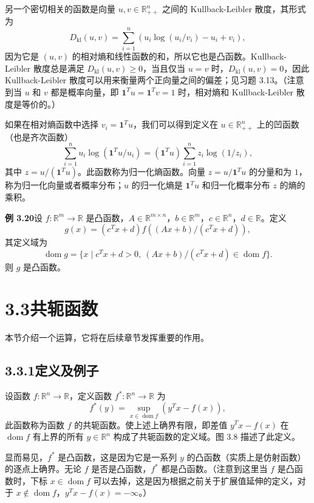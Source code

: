 \documentclass[UTF8,12pt,a4paper,fontset=fandol]{ctexart}
\DeclareMathOperator{\dom}{dom}
\begin{document}
另一个密切相关的函数是向量 $u,v\in\mathbb{R}_{++}^n$ 之间的 Kullback-Leibler 散度，其形式为
\begin{equation}
D_{\mathrm{kl}}(u,v)=\sum_{i=1}^n\left(u_i\log(u_i/v_i)-u_i+v_i\right),
\tag{3.17}
\end{equation}
因为它是 $(u,v)$ 的相对熵和线性函数的和，所以它也是凸函数。Kullback-Leibler 散度总是满足 $D_{\mathrm{kl}}(u,v)\geq0$，当且仅当 $u=v$ 时，$D_{\mathrm{kl}}(u,v)=0$，因此 Kullback-Leibler 散度可以用来衡量两个正向量之间的偏差；见习题 3.13。（注意到当 $u$ 和 $v$ 都是概率向量，即 $\mathbf{1}^Tu=\mathbf{1}^Tv=1$ 时，相对熵和 Kullback-Leibler 散度是等价的。）

如果在相对熵函数中选择 $v_i=\mathbf{1}^Tu$，我们可以得到定义在 $u\in\mathbb{R}_{++}^n$ 上的凹函数（也是齐次函数）
\[
\sum_{i=1}^n u_i\log(\mathbf{1}^Tu/u_i)
=(\mathbf{1}^Tu)\sum_{i=1}^n z_i\log(1/z_i),
\]
其中 $z=u/(\mathbf{1}^Tu)$。此函数称为归一化熵函数。向量 $z=u/\mathbf{1}^Tu$ 的分量和为 $1$，称为归一化向量或者概率分布；$u$ 的归一化熵是 $\mathbf{1}^Tu$ 和归一化概率分布 $z$ 的熵的乘积。

\noindent\textbf{例 3.20}\quad 设 $f:\mathbb{R}^m\to\mathbb{R}$ 是凸函数，$A\in\mathbb{R}^{m\times n}$，$b\in\mathbb{R}^m$，$c\in\mathbb{R}^n$，$d\in\mathbb{R}$。定义
\[
g(x)=(c^Tx+d)f((Ax+b)/(c^Tx+d)),
\]
其定义域为
\[
\dom g=\{x\mid c^Tx+d>0,\ (Ax+b)/(c^Tx+d)\in\dom f\}.
\]
则 $g$ 是凸函数。

\section*{3.3\quad 共轭函数}

本节介绍一个运算，它将在后续章节发挥重要的作用。

\subsection*{3.3.1\quad 定义及例子}

设函数 $f:\mathbb{R}^n\to\mathbb{R}$，定义函数 $f^*:\mathbb{R}^n\to\mathbb{R}$ 为
\begin{equation}
f^*(y)=\sup_{x\in\dom f}\left(y^Tx-f(x)\right),
\tag{3.18}
\end{equation}
此函数称为函数 $f$ 的共轭函数。使上述上确界有限，即差值 $y^Tx-f(x)$ 在 $\dom f$ 有上界的所有 $y\in\mathbb{R}^n$ 构成了共轭函数的定义域。图 3.8 描述了此定义。

显而易见，$f^*$ 是凸函数，这是因为它是一系列 $y$ 的凸函数（实质上是仿射函数）的逐点上确界。无论 $f$ 是否是凸函数，$f^*$ 都是凸函数。（注意到这里当 $f$ 是凸函数时，下标 $x\in\dom f$ 可以去掉，这是因为根据之前关于扩展值延伸的定义，对于 $x\notin\dom f$，$y^Tx-f(x)=-\infty$。）
\end{document}
